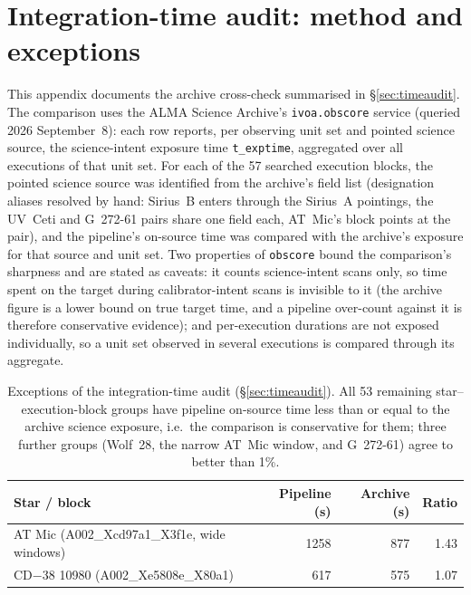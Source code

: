 \documentclass{openjournal}
\begin{document}
\section{Integration-time audit: method and exceptions}
\label{app:audit}

This appendix documents the archive cross-check summarised in
\S\ref{sec:timeaudit}. The comparison uses the ALMA Science Archive's
\texttt{ivoa.obscore} service (queried 2026 September~8): each row
reports, per observing unit set and pointed science source, the
science-intent exposure time \texttt{t\_exptime}, aggregated over all
executions of that unit set. For each of the 57 searched execution
blocks, the pointed science source was identified from the archive's
field list (designation aliases resolved by hand: Sirius~B enters
through the Sirius~A pointings, the UV~Ceti and G~272-61 pairs share
one field each, AT~Mic's block points at the pair), and the pipeline's
on-source time was compared with the archive's exposure for that
source and unit set. Two properties of \texttt{obscore} bound the
comparison's sharpness and are stated as caveats: it counts
science-intent scans only, so time spent on the target during
calibrator-intent scans is invisible to it (the archive figure is a
lower bound on true target time, and a pipeline over-count against it
is therefore conservative evidence); and per-execution durations are
not exposed individually, so a unit set observed in several executions
is compared through its aggregate.

\begin{table}
\centering
\small
\caption{Exceptions of the integration-time audit
(\S\ref{sec:timeaudit}). All 53 remaining star--execution-block
groups have pipeline on-source time less than or equal to the archive
science exposure, i.e.\ the comparison is conservative for them;
three further groups (Wolf~28, the narrow AT~Mic window, and
G~272-61) agree to better than 1\%.}
\label{tab:audit}
\begin{tabular}{@{}lrrr@{}}
\hline
Star / block & Pipeline (s) & Archive (s) & Ratio \\
\hline
AT Mic (A002\_Xcd97a1\_X3f1e, wide windows) & 1258 & 877 & 1.43 \\
CD$-$38 10980 (A002\_Xe5808e\_X80a1) & 617 & 575 & 1.07 \\
\hline
\end{tabular}
\end{table}
\end{document}
